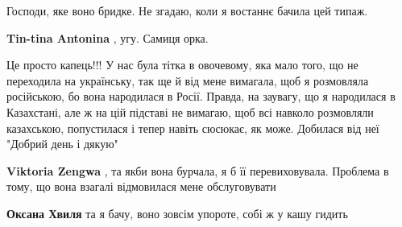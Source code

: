 \begin{itemize}
Господи, яке воно бридке. Не згадаю, коли я востаннє бачила цей типаж.

\begin{itemize}
 
\textbf{Tin-tina Antonina} , угу. Самиця орка.
\end{itemize}

 

Це просто капець!!! У нас була тітка в овочевому, яка мало того, що не
переходила на українську, так ще й від мене вимагала, щоб я розмовляла
російською, бо вона народилася в Росії. Правда, на заувагу, що я народилася в
Казахстані, але ж на цій підставі не вимагаю, щоб всі навколо розмовляли
казахською, попустилася і тепер навіть сюсюкає, як може. Добилася від неї
"Добрий день і дякую"

\begin{itemize}
 
\textbf{Viktoria Zengwa} , та якби вона бурчала, я б її перевиховувала.
Проблема в тому, що вона взагалі відмовилася мене обслуговувати

 
\textbf{Оксана Хвиля} та я бачу, воно зовсім упороте, собі ж у кашу гидить
\end{itemize}

 

\end{itemize}

